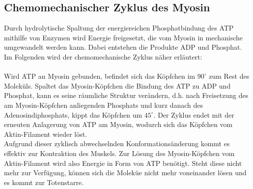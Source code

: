 \subsection{Chemomechanischer Zyklus des Myosin}
Durch hydrolytische Spaltung der energiereichen Phosphatbindung des ATP mithilfe von Enzymen wird Energie freigesetzt, die vom Myosin in mechanische umgewandelt werden kann. Dabei entstehen die Produkte ADP und Phosphat.\\
Im Folgenden wird der chemomechanische Zyklus näher erläutert:\\ 
\\
Wird ATP an Myosin gebunden, befindet sich das Köpfchen im $90^{\circ}$ zum Rest des Moleküls. Spaltet das Myosin-Köpfchen die Bindung des ATP zu ADP und Phosphat, kann es seine räumliche Struktur verändern, d.h. nach Freisetzung des am Myosin-Köpfchen anliegenden Phosphats und kurz danach des Adenosindiphosphats, kippt das Köpfchen um $45^\circ$. Der Zyklus endet mit der erneuten Anlagerung von ATP am Myosin, wodurch sich das Köpfchen vom Aktin-Filament wieder löst.\\
Aufgrund dieser zyklisch abwechselnden Konformationsänderung kommt es effektiv zur Kontraktion des Muskels.
\noindent Zur Lösung des Myosin-Köpfchen vom Aktin-Filament wird also Energie in Form von ATP benötigt. Steht diese nicht mehr zur Verfügung, können sich die Moleküe nicht mehr voneinander lösen und es kommt zur Totenstarre.
